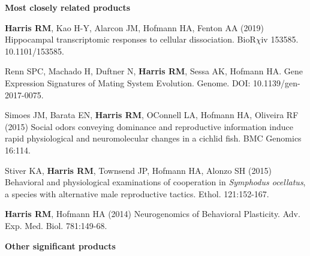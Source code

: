 \documentclass[svgnames,11pt]{article}
\begin{document}
\begin{bibsection}
\item \textbf{Most closely related products}
\end{bibsection}
\vspace{0.5 cm}

\begin{bibenum}[itemsep=5pt]

\item {\bf Harris RM}, Kao H-Y, Alarcon JM, Hofmann HA, Fenton AA (2019) Hippocampal transcriptomic responses to cellular dissociation. BioR$\chi$iv 153585. 10.1101/153585. 

\item Renn SPC, Machado H, Duftner N, {\bf Harris RM}, Sessa AK, Hofmann HA. Gene Expression Signatures of Mating System Evolution. Genome. DOI: 10.1139/gen-2017-0075.

\item Simoes JM, Barata EN, {\bf Harris RM}, O\textsc{}Connell LA, Hofmann HA, Oliveira RF (2015) Social odors conveying dominance and reproductive information induce rapid physiological and neuromolecular changes in a cichlid fish. BMC Genomics 16:114. 

\item Stiver KA, {\bf Harris RM}, Townsend JP, Hofmann HA, Alonzo SH (2015) Behavioral and physiological examinations of cooperation in {\it Symphodus ocellatus}, a species with alternative male reproductive tactics. Ethol. 121:152-167.

\item {\bf Harris RM}, Hofmann HA (2014) Neurogenomics of Behavioral Plasticity. Adv. Exp. Med. Biol. 781:149-68. 

\end{bibenum}

\vspace{0.5 cm}
\begin{bibsection}
\item \textbf{Other significant products}
\end{bibsection}
\vspace{0.5 cm}
\end{document}

